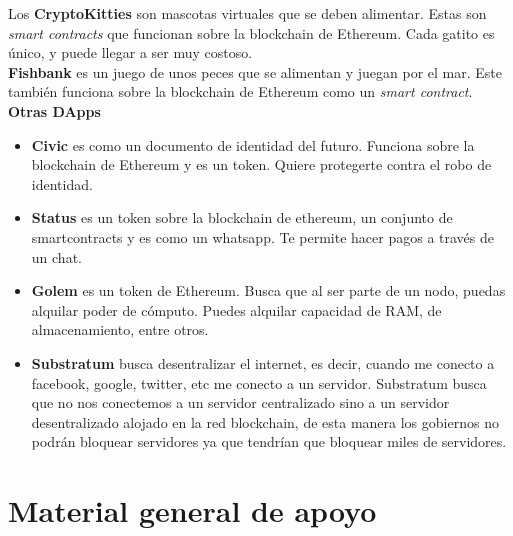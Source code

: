 \documentclass[a4paper,12pt]{/home/armando/Documentos/Cursos/LaTeX/Plantillas/lib/pub}
\begin{document}
Los \textbf{CryptoKitties} son mascotas virtuales que se deben alimentar. Estas son \textit{smart contracts} que funcionan sobre la blockchain de Ethereum. Cada gatito es único, y puede llegar a ser muy costoso.\\

\textbf{Fishbank} es un juego de unos peces que se alimentan y juegan por el mar. Este también funciona sobre la blockchain de Ethereum como un \textit{smart contract}.\\

\textbf{Otras DApps}
\begin{itemize}
	\item \textbf{Civic} es como un documento de identidad del futuro. Funciona sobre la blockchain de Ethereum y es un token. Quiere protegerte contra el robo de identidad.
	\item \textbf{Status} es un token sobre la blockchain de ethereum, un conjunto de smartcontracts y es como un whatsapp. Te permite hacer pagos a través de un chat.
	\item \textbf{Golem} es un token de Ethereum. Busca que al ser parte de un nodo, puedas alquilar poder de cómputo. Puedes alquilar capacidad de RAM, de almacenamiento, entre otros.
	\item \textbf{Substratum} busca desentralizar el internet, es decir, cuando me conecto a facebook, google, twitter, etc me conecto a un servidor. Substratum busca que no nos conectemos a un servidor centralizado sino a un servidor desentralizado alojado en la red blockchain, de esta manera los gobiernos no podrán bloquear servidores ya que tendrían que bloquear miles de servidores.
\end{itemize}
\newpage
\section{Material general de apoyo}
\end{document}
